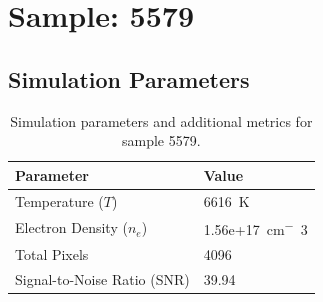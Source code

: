 \documentclass[a4paper,11pt]{article}
\begin{document}
\clearpage

\section{Sample: 5579}
\subsection{Simulation Parameters}
\begin{table}[h!]
    \centering
    \begin{tabular}{ll}
        \toprule
        \textbf{Parameter} & \textbf{Value} \\
        \midrule
        Temperature ($T$) & 6616 \,\si{K} \\
        Electron Density ($n_e$) & 1.56e+17 \,\si{cm^-3} \\
        Total Pixels & 4096 \\
        Signal-to-Noise Ratio (SNR) & 39.94 \\
        \bottomrule
    \end{tabular}
    \caption{Simulation parameters and additional metrics for sample 5579.}
    \label{tab:params_5579}
\end{table}
\end{document}

